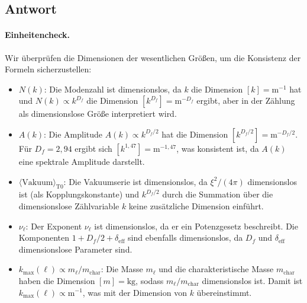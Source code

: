\documentclass[12pt,a4paper]{article}
\theoremstyle{remark}
\newenvironment{answer}{\subsection*{Antwort}}{\vspace{1em}}
\begin{document}
\begin{answer}
\paragraph{Einheitencheck.}
Wir überprüfen die Dimensionen der wesentlichen Größen, um die Konsistenz der Formeln sicherzustellen:
\begin{itemize}
	\item $N(k)$: Die Modenzahl ist dimensionslos, da $k$ die Dimension $[k] = \text{m}^{-1}$ hat und $N(k) \propto k^{D_f}$ die Dimension $[k^{D_f}] = \text{m}^{-D_f}$ ergibt, aber in der Zählung als dimensionslose Größe interpretiert wird.
	\item $A(k)$: Die Amplitude $A(k) \propto k^{D_f / 2}$ hat die Dimension $[k^{D_f / 2}] = \text{m}^{-D_f / 2}$. Für $D_f = 2{,}94$ ergibt sich $[k^{1{,}47}] = \text{m}^{-1{,}47}$, was konsistent ist, da $A(k)$ eine spektrale Amplitude darstellt.
	\item $\langle \text{Vakuum} \rangle_{\text{T0}}$: Die Vakuumserie ist dimensionslos, da $\xi^2 / (4\pi)$ dimensionslos ist (als Kopplungskonstante) und $k^{D_f / 2}$ durch die Summation über die dimensionslose Zählvariable $k$ keine zusätzliche Dimension einführt.
	\item $\nu_\ell$: Der Exponent $\nu_\ell$ ist dimensionslos, da er ein Potenzgesetz beschreibt. Die Komponenten $1 + D_f / 2 + \delta_{\text{eff}}$ sind ebenfalls dimensionslos, da $D_f$ und $\delta_{\text{eff}}$ dimensionslose Parameter sind.
	\item $k_{\max}(\ell) \propto m_\ell / m_{\text{char}}$: Die Masse $m_\ell$ und die charakteristische Masse $m_{\text{char}}$ haben die Dimension $[m] = \text{kg}$, sodass $m_\ell / m_{\text{char}}$ dimensionslos ist. Damit ist $k_{\max}(\ell) \propto \text{m}^{-1}$, was mit der Dimension von $k$ übereinstimmt.
\end{itemize}


\end{answer}
\end{document}
